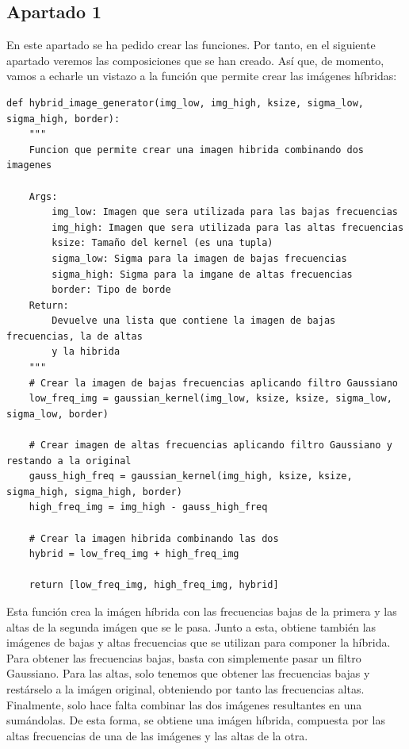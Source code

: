 \documentclass[11pt,a4paper]{article}
\begin{document}
\subsection{Apartado 1}

En este apartado se ha pedido crear las funciones. Por tanto, en el siguiente apartado veremos las composiciones
que se han creado. Así que, de momento, vamos a echarle un vistazo a la función que permite crear las imágenes híbridas:

\begin{lstlisting}[caption={Función que crea imágenes híbridas.},label={alg:hybrid-img}]
def hybrid_image_generator(img_low, img_high, ksize, sigma_low, sigma_high, border):
    """
    Funcion que permite crear una imagen hibrida combinando dos imagenes

    Args:
        img_low: Imagen que sera utilizada para las bajas frecuencias
        img_high: Imagen que sera utilizada para las altas frecuencias
        ksize: Tamaño del kernel (es una tupla)
        sigma_low: Sigma para la imagen de bajas frecuencias
        sigma_high: Sigma para la imgane de altas frecuencias
        border: Tipo de borde
    Return:
        Devuelve una lista que contiene la imagen de bajas frecuencias, la de altas
        y la hibrida
    """
    # Crear la imagen de bajas frecuencias aplicando filtro Gaussiano
    low_freq_img = gaussian_kernel(img_low, ksize, ksize, sigma_low, sigma_low, border)

    # Crear imagen de altas frecuencias aplicando filtro Gaussiano y restando a la original
    gauss_high_freq = gaussian_kernel(img_high, ksize, ksize, sigma_high, sigma_high, border)
    high_freq_img = img_high - gauss_high_freq

    # Crear la imagen hibrida combinando las dos
    hybrid = low_freq_img + high_freq_img

    return [low_freq_img, high_freq_img, hybrid]
\end{lstlisting}

Esta función crea la imágen híbrida con las frecuencias bajas de la primera y las altas de la segunda imágen que se le pasa.
Junto a esta, obtiene también las imágenes de bajas y altas frecuencias que se utilizan para componer la híbrida.
Para obtener las frecuencias bajas, basta con simplemente pasar un filtro Gaussiano. Para las altas, solo tenemos que obtener
las frecuencias bajas y restárselo a la imágen original, obteniendo por tanto las frecuencias altas. Finalmente, solo hace
falta combinar las dos imágenes resultantes en una sumándolas. De esta forma, se obtiene una imágen híbrida, compuesta
por las altas frecuencias de una de las imágenes y las altas de la otra.
\end{document}
